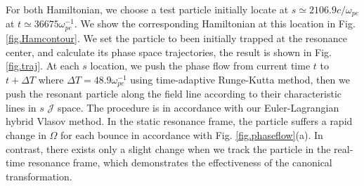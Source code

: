 For both Hamiltonian, we choose a test particle initially locate at $s \simeq 2106.9 c/\omega_{pe}$ at $t\simeq 36675 \omega_{pe}^{-1}$. We show the corresponding Hamiltonian at this location in Fig. \ref{fig.Hamcontour}. We set the particle to been initially trapped at the resonance center, and calculate its phase space trajectories, the result is shown in Fig. \ref{fig.traj}. At each $s$ location, we push the phase flow from current time $t$ to $t+\Delta T$ where $\Delta T= 48.9 \omega_{pe}^{-1}$ using time-adaptive Runge-Kutta method, then we push the resonant particle along the field line according to their characteristic lines in $s$ $\mathcal{J}$ space.
The procedure is in accordance with our Euler-Lagrangian hybrid Vlasov method.
In the static  resonance frame, the particle suffers a rapid change in $\Omega$ for each bounce in accordance with  Fig. \ref{fig.phaseflow}(a).
In contrast, there exists only a slight change when we track the particle in the real-time resonance frame, which demonstrates the effectiveness of the canonical transformation.


